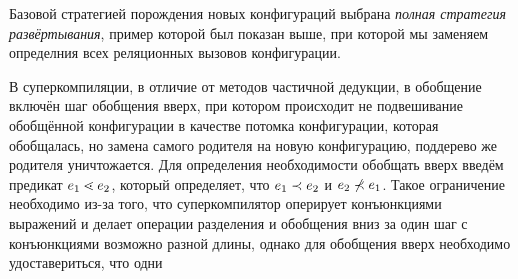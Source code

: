 

Базовой стратегией порождения новых конфигураций выбрана \emph{полная стратегия развёртывания},
пример которой был показан выше, при которой мы заменяем определния всех реляционных вызовов
конфигурации.

В суперкомпиляции, в отличие от методов частичной дедукции, в обобщение включён
шаг обобщения вверх, при котором происходит не подвешивание обобщённой конфигурации
в качестве потомка конфигурации, которая обобщалась, но замена самого родителя на
новую конфигурацию, поддерево же родителя уничтожается. Для определения
необходимости обобщать вверх введём предикат $e_1 \lessdot e_2$, который
определяет, что $e_1 \prec e_2$ и $e_2 \not\prec e_1$.
Такое ограничение необходимо из-за того, что суперкомпилятор оперирует
конъюнкциями выражений и делает операции разделения и обобщения вниз
за один шаг с конъюнкциями возможно разной длины, однако для обобщения
вверх необходимо удоставериться, что одни 





